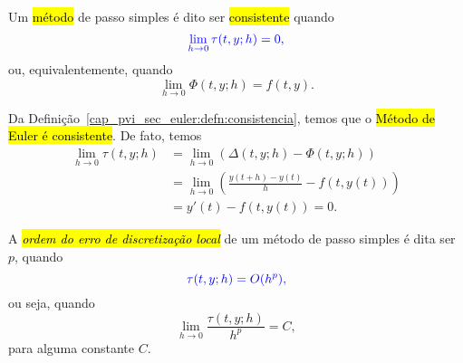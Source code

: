\begin{defn}\label{cap_pvi_sec_euler:defn:consistencia}
  Um \hl{método} de passo simples é dito ser \hl{consistente} quando
  \begin{equation}\color{blue}\lim_{h\to 0}\tau(t,y;h) = 0,
  \end{equation}
  ou, equivalentemente, quando
  \begin{equation}
    \lim_{h\to 0} \Phi(t, y; h) = f(t, y).
  \end{equation}
\end{defn}

\begin{obs}
  Da Definição~\ref{cap_pvi_sec_euler:defn:consistencia}, temos que o \hl{Método de Euler é consistente}. De fato, temos
  \begin{align}
    \lim_{h\to 0} \tau(t, y; h) &= \lim_{h\to 0} \left(\Delta(t, y; h) - \Phi(t, y; h)\right)\\
                                &= \lim_{h\to 0} \left(\frac{y(t+h)-y(t)}{h} - f\left(t,y(t)\right)\right)\\
                                &= y'(t) - f\left(t, y(t)\right) = 0.
  \end{align}
\end{obs}

A \hl{\emph{ordem do erro de discretização local}} de um método de passo simples é dita ser $p$, quando
\begin{equation}\color{blue}\tau(t, y; h) = O(h^p),
\end{equation}
ou seja, quando
\begin{equation}
  \lim_{h\to 0} \frac{\tau(t, y; h)}{h^p} = C,
\end{equation}
para alguma constante $C$.

